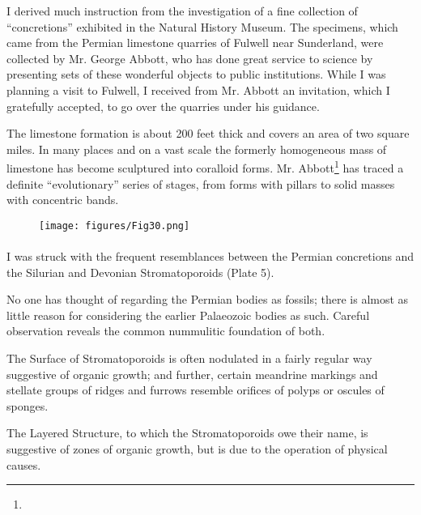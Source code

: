 \documentclass[a4paper, 12pt, oneside]{article}
\begin{document}
I derived much instruction from the investigation of a fine collection of ``concretions'' exhibited in the Natural History Museum. The specimens, which came from the Permian limestone quarries of Fulwell near Sunderland, were collected by Mr. George Abbott, who has done great service to science by presenting sets of these wonderful objects to public institutions. While I was planning a visit to Fulwell, I received from Mr. Abbott an invitation, which I gratefully accepted, to go over the quarries under his guidance.

The limestone formation is about 200 feet thick and covers an area of two square miles. In many places and on a vast scale the formerly homogeneous mass of limestone has become sculptured into coralloid forms. Mr. Abbott\footnote{} has traced a definite ``evolutionary'' series of stages, from forms with pillars to solid masses with concentric bands.
\begin{figure}[H]
\centering
\texttt{[image: figures/Fig30.png]}
\caption*{}
\end{figure}
\paragraph{}
I was struck with the frequent resemblances between the Permian concretions and the Silurian and Devonian Stromatoporoids (Plate 5).

No one has thought of regarding the Permian bodies as fossils; there is almost as little reason for considering the earlier Palaeozoic bodies as such. Careful observation reveals the common nummulitic foundation of both.

The Surface of Stromatoporoids is often nodulated in a fairly regular way suggestive of organic growth; and further, certain meandrine markings and stellate groups of ridges and furrows resemble orifices of polyps or oscules of sponges.

The Layered Structure, to which the Stromatoporoids owe their name, is suggestive of zones of organic growth, but is due to the operation of physical causes.
\end{document}
